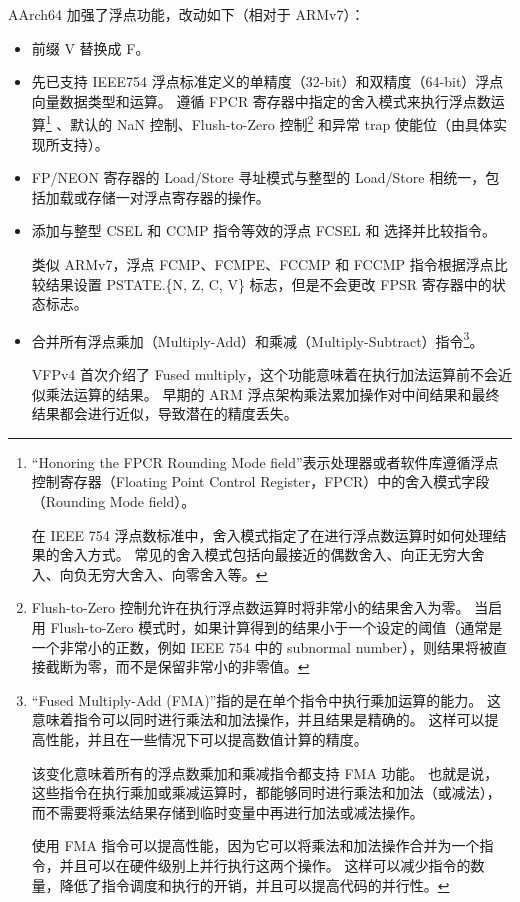 AArch64 加强了浮点功能，改动如下（相对于 ARMv7）：

\begin{itemize}
  \item 前缀 V 替换成 F。
  \item 先已支持 IEEE754 浮点标准定义的单精度（32-bit）和双精度（64-bit）浮点向量数据类型和运算。
    遵循 FPCR 寄存器中指定的舍入模式来执行浮点数运算\footnote{
    “Honoring the FPCR Rounding Mode field”表示处理器或者软件库遵循浮点控制寄存器（Floating Point Control Register，FPCR）中的舍入模式字段（Rounding Mode field）。

      在 IEEE 754 浮点数标准中，舍入模式指定了在进行浮点数运算时如何处理结果的舍入方式。
      常见的舍入模式包括向最接近的偶数舍入、向正无穷大舍入、向负无穷大舍入、向零舍入等。
    }
    、默认的 NaN 控制、Flush-to-Zero 控制\footnote{
      Flush-to-Zero 控制允许在执行浮点数运算时将非常小的结果舍入为零。
      当启用 Flush-to-Zero 模式时，如果计算得到的结果小于一个设定的阈值（通常是一个非常小的正数，例如 IEEE 754 中的 subnormal number），则结果将被直接截断为零，而不是保留非常小的非零值。
    }
    和异常 trap 使能位（由具体实现所支持）。
  \item FP/NEON 寄存器的 Load/Store 寻址模式与整型的 Load/Store 相统一，包括加载或存储一对浮点寄存器的操作。
  \item 添加与整型 CSEL 和 CCMP 指令等效的浮点 FCSEL 和 选择并比较指令。

    类似 ARMv7，浮点 FCMP、FCMPE、FCCMP 和 FCCMP 指令根据浮点比较结果设置 PSTATE.\{N, Z, C, V\} 标志，但是不会更改 FPSR 寄存器中的状态标志。
  \item 合并所有浮点乘加（Multiply-Add）和乘减（Multiply-Subtract）指令\footnote{
      “Fused Multiply-Add (FMA)”指的是在单个指令中执行乘加运算的能力。
      这意味着指令可以同时进行乘法和加法操作，并且结果是精确的。
      这样可以提高性能，并且在一些情况下可以提高数值计算的精度。

      该变化意味着所有的浮点数乘加和乘减指令都支持 FMA 功能。
      也就是说，这些指令在执行乘加或乘减运算时，都能够同时进行乘法和加法（或减法），而不需要将乘法结果存储到临时变量中再进行加法或减法操作。

      使用 FMA 指令可以提高性能，因为它可以将乘法和加法操作合并为一个指令，并且可以在硬件级别上并行执行这两个操作。
      这样可以减少指令的数量，降低了指令调度和执行的开销，并且可以提高代码的并行性。
    }。

    VFPv4 首次介绍了 Fused multiply，这个功能意味着在执行加法运算前不会近似乘法运算的结果。
    早期的 ARM 浮点架构乘法累加操作对中间结果和最终结果都会进行近似，导致潜在的精度丢失。


\end{itemize}
